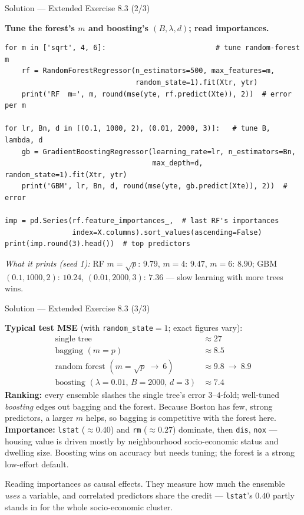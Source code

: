 \documentclass[aspectratio=169,11pt]{beamer}
\begin{document}
\begin{frame}[fragile]{Solution --- Extended Exercise 8.3 (2/3)}
\begin{solutionbox}
\textbf{Tune the forest's $m$ and boosting's $(B,\lambda,d)$; read importances.}
\begin{lstlisting}[basicstyle=\ttfamily\scriptsize]
for m in ['sqrt', 4, 6]:                          # tune random-forest m
    rf = RandomForestRegressor(n_estimators=500, max_features=m,
                               random_state=1).fit(Xtr, ytr)
    print('RF  m=', m, round(mse(yte, rf.predict(Xte)), 2))  # error per m

for lr, Bn, d in [(0.1, 1000, 2), (0.01, 2000, 3)]:   # tune B, lambda, d
    gb = GradientBoostingRegressor(learning_rate=lr, n_estimators=Bn,
                                   max_depth=d, random_state=1).fit(Xtr, ytr)
    print('GBM', lr, Bn, d, round(mse(yte, gb.predict(Xte)), 2))  # error

imp = pd.Series(rf.feature_importances_,  # last RF's importances
                index=X.columns).sort_values(ascending=False)
print(imp.round(3).head())  # top predictors
\end{lstlisting}
\emph{What it prints (seed 1):} RF $m{=}\sqrt p$: $9.79$, $m{=}4$: $9.47$, $m{=}6$: $8.90$; GBM $(0.1,1000,2)$: $10.24$, $(0.01,2000,3)$: $7.36$ --- slow learning with more trees wins.
\end{solutionbox}
\end{frame}

\begin{frame}{Solution --- Extended Exercise 8.3 (3/3)}
\begin{solutionbox}
\textbf{Typical test MSE} (with \texttt{random\_state}${=}1$; exact figures vary):
\[
\begin{array}{l|c}
\text{single tree} & \approx 27\\
\text{bagging } (m=p) & \approx 8.5\\
\text{random forest } (m=\sqrt p \ \to\ 6) & \approx 9.8\ \to\ 8.9\\
\text{boosting } (\lambda{=}0.01,\,B{=}2000,\,d{=}3) & \approx 7.4
\end{array}
\]
\textbf{Ranking:} every ensemble slashes the single tree's error $3$--$4$-fold; well-tuned \emph{boosting} edges out bagging and the forest. Because Boston has few, strong predictors, a larger $m$ helps, so bagging is competitive with the forest here. \textbf{Importance:} \texttt{lstat} ($\approx0.40$) and \texttt{rm} ($\approx0.27$) dominate, then \texttt{dis}, \texttt{nox} --- housing value is driven mostly by neighbourhood socio-economic status and dwelling size. Boosting wins on accuracy but needs tuning; the forest is a strong low-effort default.
\end{solutionbox}
\begin{mistake}
Reading importances as causal effects. They measure how much the ensemble \emph{uses} a variable, and correlated predictors share the credit --- \texttt{lstat}'s $0.40$ partly stands in for the whole socio-economic cluster.
\end{mistake}
\end{frame}
\end{document}

